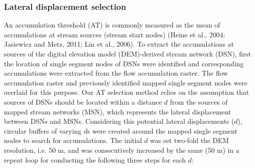\subsubsection{Lateral displacement selection}
\label{Lateral displacement selection}

An accumulation threshold (AT) is commonly measured as the mean of accumulations at stream sources (stream start nodes) (Heine et al., 2004; Jasiewicz and Metz, 2011; Lin et al., 2006). To extract the accumulations at sources of the digital elevation model (DEM)-derived stream network (DSN), first the location of single segment nodes of DSNs were identified and corresponding accumulations were extracted from the flow accumulation raster. The flow accumulation raster and previously identified mapped single segment nodes were overlaid for this purpose. Our AT selection method relies on the assumption that sources of DSNs should be located within a distance $d$ from the sources of mapped stream networks (MSN), which represents the lateral displacement between DSNs and MSNs. Considering this potential lateral displacements ($d$), circular buffers of varying $d$s were created around the mapped single segment nodes to search for accumulations. The initial $d$ was set two-fold the DEM resolution, i.e. 50 m, and was consecutively increased by the same (50 m) in a repeat loop for conducting the following three steps for each $d$:

